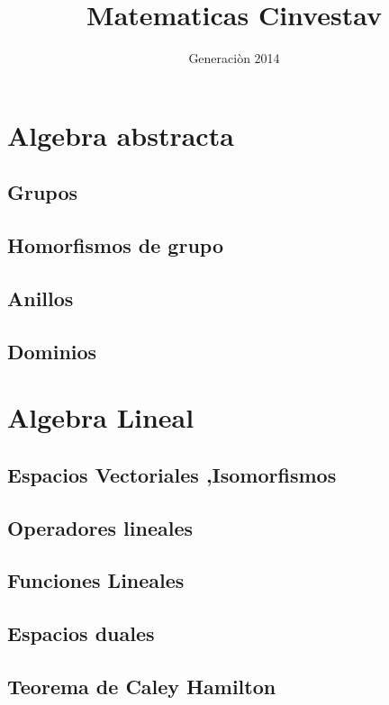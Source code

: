 \documentclass{tufte-book}
\title{Matematicas Cinvestav}
\author{Generaci\`on 2014}
\numberwithin{equation}{chapter}
\begin{document}
  \maketitle
  \tableofcontents
  \part{Algebra abstracta}
    \chapter{Grupos}
      
      
      
    \chapter{Homorfismos de grupo}
      
    \chapter{Anillos}
    \chapter{Dominios}
  \part{Algebra Lineal}
    \chapter{Espacios Vectoriales ,Isomorfismos}
    \chapter{Operadores lineales}
    \chapter{Funciones Lineales}
    \chapter{Espacios duales}
    \chapter{Teorema de Caley Hamilton}
\end{document}
